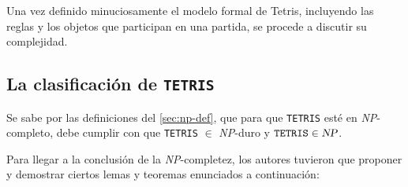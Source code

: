 Una vez definido minuciosamente el modelo formal de Tetris, incluyendo las
reglas y los objetos que participan en una partida, se procede a discutir su
complejidad.

\subsection{La clasificación de \texttt{TETRIS}}

Se sabe por las definiciones del \cref{sec:np-def}, que para que
\texttt{TETRIS} esté en \textsl{NP}-completo, debe cumplir con que
\texttt{TETRIS} $\in$ \textsl{NP}-duro y $\texttt{TETRIS} \in \textsl{NP}$.

Para llegar a la conclusión de la \textsl{NP}-completez, los autores tuvieron
que proponer y demostrar ciertos lemas y teoremas enunciados a continuación:

